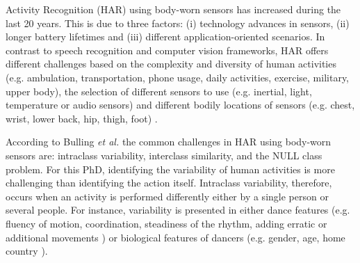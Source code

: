 \documentclass[10pt,journal,compsoc]{IEEEtran}
\begin{document}

% 
% 
% 
% 


 Activity Recognition (HAR) using body-worn sensors has increased 
during the last 20 years. This is due to three factors: (i) technology advances in sensors, 
(ii) longer battery lifetimes and  (iii) different application-oriented scenarios.
In contrast to speech recognition and computer vision frameworks, HAR offers different 
challenges based on the complexity and diversity of human activities 
(e.g. ambulation, transportation, phone usage, daily activities, exercise, military, upper body),
the selection of different sensors to use (e.g. inertial, light, temperature or audio sensors)
\cite{Lara2013} and different bodily locations of sensors
(e.g. chest, wrist, lower back, hip, thigh, foot) \cite{Cleland2013, Mannini2013}.

According to Bulling \emph{et al.}  \cite{bulling2014} the common challenges in HAR
using body-worn sensors are: 
intraclass variability, interclass similarity, and the NULL class problem.
For this PhD, identifying the variability of human activities is more challenging than 
identifying the action itself. Intraclass variability, therefore, occurs when an 
activity is performed differently either by a single person or several people.
For instance, variability is presented in either dance features 
(e.g. fluency of motion, coordination, steadiness of the rhythm, 
adding erratic or additional movements \cite{Grammer2011, Aristidou2014}) 
or biological features of 
dancers (e.g. gender, age, home country \cite{Grammer2011, Iwai2011}). 
\end{document}
